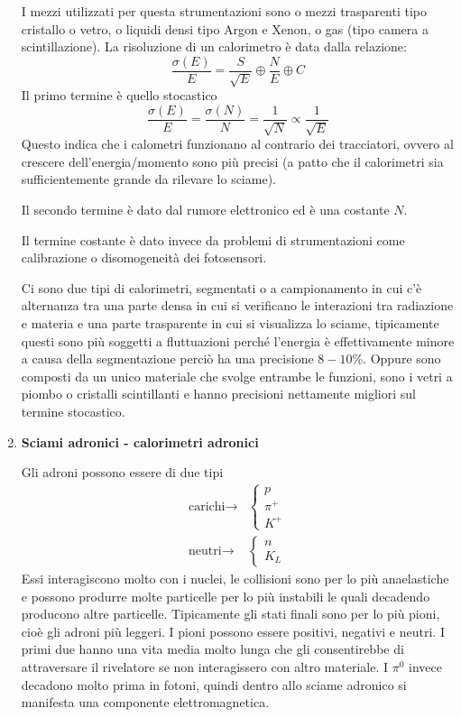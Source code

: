 \documentclass[12pt]{book}
\begin{document}
\begin{enumerate}
I mezzi utilizzati per questa strumentazioni sono o mezzi trasparenti tipo cristallo o vetro, o liquidi densi tipo Argon e Xenon, o gas (tipo camera a scintillazione). La risoluzione di un calorimetro è data dalla relazione:
\begin{equation}
	\frac{\sigma(E)}{E} = \frac{S}{\sqrt E} \oplus \frac{N}{E} \oplus C
\end{equation}
Il primo termine è quello stocastico
\begin{equation}
	\frac{\sigma (E)}{E} = \frac{\sigma (N)}{N} = \frac{1}{\sqrt{N}} \propto \frac{1}{\sqrt E}
\end{equation}
Questo indica che i calometri funzionano al contrario dei tracciatori, ovvero al crescere dell'energia/momento sono più precisi (a patto che il calorimetri sia sufficientemente grande da rilevare lo sciame).

Il secondo termine è dato dal rumore elettronico ed è una costante $N$.


Il termine costante è dato invece da problemi di strumentazioni come calibrazione o disomogeneità dei fotosensori.

Ci sono due tipi di calorimetri, segmentati o a campionamento in cui c'è alternanza tra una parte densa in cui si verificano le interazioni tra radiazione e materia e una parte trasparente in cui si visualizza lo sciame, tipicamente questi sono più soggetti a fluttuazioni perché l'energia è effettivamente minore a causa della segmentazione perciò ha una precisione $8-10 \%$. Oppure sono composti da un unico materiale che svolge entrambe le funzioni, sono i vetri a piombo o cristalli scintillanti e hanno precisioni nettamente migliori sul termine stocastico.

\item \textbf{Sciami adronici - calorimetri adronici}

Gli adroni possono essere di due tipi
\begin{align*}
	\text{carichi}\rightarrow &\begin{cases}
 	p\\
 	\pi^+\\
 	K^+
 \end{cases}\\
 \text{neutri} \rightarrow &\begin{cases}
 	n\\
 	K_L
 \end{cases}
\end{align*}
Essi interagiscono molto con i nuclei, le collisioni sono per lo più anaelastiche e possono produrre molte particelle per lo più instabili le quali decadendo producono altre particelle. Tipicamente gli stati finali sono per lo più pioni, cioè gli adroni più leggeri. I pioni possono essere positivi, negativi e neutri. I primi due hanno una vita media molto lunga che gli consentirebbe di attraversare il rivelatore se non interagissero con altro materiale. I $\pi^0$ invece decadono molto prima in fotoni, quindi dentro allo sciame adronico si manifesta una componente elettromagnetica.


\end{enumerate}
\end{document}
